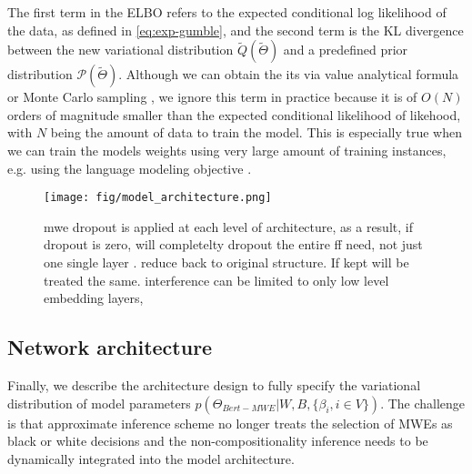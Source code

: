 The first term in the ELBO refers to the expected conditional log likelihood of the data, as defined in \autoref{eq:exp-gumble}, 
and the second term is the KL divergence between the new variational distribution $\tilde{Q} ( \tilde{\Theta})$ 
and a predefined prior distribution  $\mathcal{P}( \tilde{\Theta})$.
Although we can obtain the its via value analytical formula or Monte Carlo sampling \cite{gal2016uncertainty}, 
we ignore this term in practice because it is of $O(N)$ orders of magnitude smaller than the expected conditional likelihood of likehood, with $N$ being the amount of data to train the model. 
This is especially true when we can train the models weights using very large amount of training instances, e.g. using the language modeling objective \cite{devlin2018bert}.





\begin{figure}[htb]
    \centering
    \texttt{[image: fig/model\_architecture.png]}
    \vspace{20pt}
    \caption{mwe dropout is applied at each level of architecture, as a result,
    if dropout is zero, will completelty dropout the entire ff need, not just one single layer
    . reduce back to original structure.  If kept will be treated the same.
    interference can be limited to only low level embedding layers, }
    \vspace{10pt}
    \label{fig:architecture-mwe-dropout}
\end{figure}






\subsection{Network architecture}
Finally, we describe the architecture design to fully specify the  variational distribution of model parameters $p(\Theta_{Bert-MWE} \vert W, B, \{\beta_i, i \in V\})$. 
The challenge is that approximate inference scheme no longer treats the selection of MWEs as black or white decisions and the non-compositionality inference needs to be dynamically integrated into the model architecture. 


